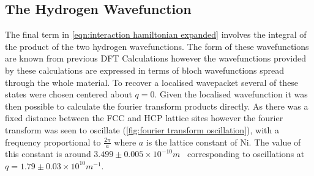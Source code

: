 \subsection{The Hydrogen Wavefunction}
The final term in
\cref{eqn:interaction hamiltonian expanded}
involves the integral
of the product of the two
hydrogen wavefunctions.
The form of these wavefunctions
are known from
previous DFT Calculations\cite{Jianding-Zhu}
however the wavefunctions provided
by these calculations
are expressed in terms of bloch wavefunctions spread
through the whole material.
To recover a localised
wavepacket several of these states were chosen
centered about \(q=0\).
Given the localised wavefunction
it was then possible to calculate the fourier
transform products directly. As there was a fixed
distance between the FCC and HCP lattice
sites however the fourier transform was seen to
oscillate (\cref{fig:fourier transform oscillation}),
with a frequency proportional to
\(\frac{2\pi}{a}\) where \(a\) is the lattice
constant of Ni. The value of this constant
is around
\(3.499\pm{}0.005\times{}10^{-10}m\)~\cite{PhysRev.25.753}
corresponding to oscillations at
\(q = 1.79 \pm 0.03 \times{}10^{10}m^{-1}\).
